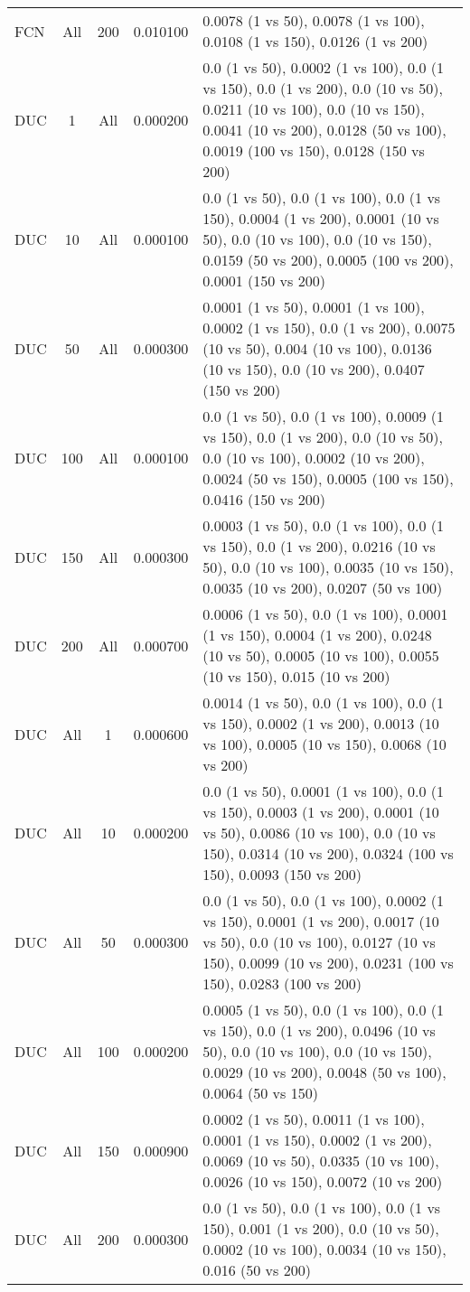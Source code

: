 \begin{tabular}{|l|c|c|c|p{7cm}|}
FCN & All & 200 & 0.010100 & 0.0078 (1 vs 50), 0.0078 (1 vs 100), 0.0108 (1 vs 150), 0.0126 (1 vs 200) \\
DUC & 1 & All & 0.000200 & 0.0 (1 vs 50), 0.0002 (1 vs 100), 0.0 (1 vs 150), 0.0 (1 vs 200), 0.0 (10 vs 50), 0.0211 (10 vs 100), 0.0 (10 vs 150), 0.0041 (10 vs 200), 0.0128 (50 vs 100), 0.0019 (100 vs 150), 0.0128 (150 vs 200) \\
DUC & 10 & All & 0.000100 & 0.0 (1 vs 50), 0.0 (1 vs 100), 0.0 (1 vs 150), 0.0004 (1 vs 200), 0.0001 (10 vs 50), 0.0 (10 vs 100), 0.0 (10 vs 150), 0.0159 (50 vs 200), 0.0005 (100 vs 200), 0.0001 (150 vs 200) \\
DUC & 50 & All & 0.000300 & 0.0001 (1 vs 50), 0.0001 (1 vs 100), 0.0002 (1 vs 150), 0.0 (1 vs 200), 0.0075 (10 vs 50), 0.004 (10 vs 100), 0.0136 (10 vs 150), 0.0 (10 vs 200), 0.0407 (150 vs 200) \\
DUC & 100 & All & 0.000100 & 0.0 (1 vs 50), 0.0 (1 vs 100), 0.0009 (1 vs 150), 0.0 (1 vs 200), 0.0 (10 vs 50), 0.0 (10 vs 100), 0.0002 (10 vs 200), 0.0024 (50 vs 150), 0.0005 (100 vs 150), 0.0416 (150 vs 200) \\
DUC & 150 & All & 0.000300 & 0.0003 (1 vs 50), 0.0 (1 vs 100), 0.0 (1 vs 150), 0.0 (1 vs 200), 0.0216 (10 vs 50), 0.0 (10 vs 100), 0.0035 (10 vs 150), 0.0035 (10 vs 200), 0.0207 (50 vs 100) \\
DUC & 200 & All & 0.000700 & 0.0006 (1 vs 50), 0.0 (1 vs 100), 0.0001 (1 vs 150), 0.0004 (1 vs 200), 0.0248 (10 vs 50), 0.0005 (10 vs 100), 0.0055 (10 vs 150), 0.015 (10 vs 200) \\
DUC & All & 1 & 0.000600 & 0.0014 (1 vs 50), 0.0 (1 vs 100), 0.0 (1 vs 150), 0.0002 (1 vs 200), 0.0013 (10 vs 100), 0.0005 (10 vs 150), 0.0068 (10 vs 200) \\
DUC & All & 10 & 0.000200 & 0.0 (1 vs 50), 0.0001 (1 vs 100), 0.0 (1 vs 150), 0.0003 (1 vs 200), 0.0001 (10 vs 50), 0.0086 (10 vs 100), 0.0 (10 vs 150), 0.0314 (10 vs 200), 0.0324 (100 vs 150), 0.0093 (150 vs 200) \\
DUC & All & 50 & 0.000300 & 0.0 (1 vs 50), 0.0 (1 vs 100), 0.0002 (1 vs 150), 0.0001 (1 vs 200), 0.0017 (10 vs 50), 0.0 (10 vs 100), 0.0127 (10 vs 150), 0.0099 (10 vs 200), 0.0231 (100 vs 150), 0.0283 (100 vs 200) \\
DUC & All & 100 & 0.000200 & 0.0005 (1 vs 50), 0.0 (1 vs 100), 0.0 (1 vs 150), 0.0 (1 vs 200), 0.0496 (10 vs 50), 0.0 (10 vs 100), 0.0 (10 vs 150), 0.0029 (10 vs 200), 0.0048 (50 vs 100), 0.0064 (50 vs 150) \\
DUC & All & 150 & 0.000900 & 0.0002 (1 vs 50), 0.0011 (1 vs 100), 0.0001 (1 vs 150), 0.0002 (1 vs 200), 0.0069 (10 vs 50), 0.0335 (10 vs 100), 0.0026 (10 vs 150), 0.0072 (10 vs 200) \\
DUC & All & 200 & 0.000300 & 0.0 (1 vs 50), 0.0 (1 vs 100), 0.0 (1 vs 150), 0.001 (1 vs 200), 0.0 (10 vs 50), 0.0002 (10 vs 100), 0.0034 (10 vs 150), 0.016 (50 vs 200) \\
\bottomrule
\end{tabular}

